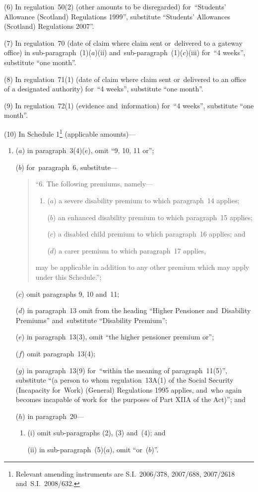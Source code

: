 \documentclass[12pt,a4paper]{article}
\begin{document}
(6) In regulation~50(2) (other amounts to be disregarded) for~“Students’ Allowance (Scotland) Regulations 1999”, substitute “Students’ Allowances (Scotland) Regulations 2007”.

(7) In regulation~70 (date of claim where claim sent or~delivered to a gateway office) in sub-paragraph~(1)($a$)(ii)  and~sub-paragraph~(1)($c$)(iii)  for~“4 weeks”, substitute “one month”.

(8) In regulation~71(1) (date of claim where claim sent or~delivered to an office of a designated authority) for~“4 weeks”, substitute “one month”.

(9) In regulation~72(1) (evidence and~information) for~“4 weeks”, substitute “one month”.

(10) In Schedule 1\footnote{Relevant amending instruments are S.I.~2006/378, 2007/688, 2007/2618 and~S.I.~2008/632.} (applicable amounts)—
\begin{enumerate}\item[]
($a$) in paragraph~3(4)($e$), omit “9, 10, 11 or”;

($b$) for~paragraph~6, substitute—
\begin{quotation}
“6.  The following premiums, namely—
\begin{enumerate}\item[]
($a$) a severe disability premium to which paragraph~14 applies;

($b$) an enhanced disability premium to which paragraph~15 applies;

($c$) a disabled child premium to which paragraph~16 applies; and

($d$) a carer premium to which paragraph~17 applies,
\end{enumerate}
may be applicable in addition to any other premium which may apply under this     Schedule.”;
\end{quotation}

($c$) omit paragraphs 9, 10 and~11;

($d$) in paragraph~13 omit from the heading “Higher Pensioner and~Disability Premiums” and~substitute “Disability Premium”;

($e$) in paragraph~13(3), omit “the higher pensioner premium or”;

($f$) omit paragraph~13(4);

($g$) in paragraph~13(9) for~“within the meaning of paragraph~11(5)”, substitute “(a person to whom regulation~13A(1) of the Social Security (Incapacity for~Work) (General) Regulations 1995 applies, and~who again becomes incapable of work for~the purposes of Part XIIA of the Act)”; and

($h$) in paragraph~20—
\begin{enumerate}\item[]
(i) omit sub-paragraphs (2), (3) and~(4); and

(ii) in sub-paragraph~(5)($a$), omit “or~($b$)”.
\end{enumerate}
\end{enumerate}
\end{document}
